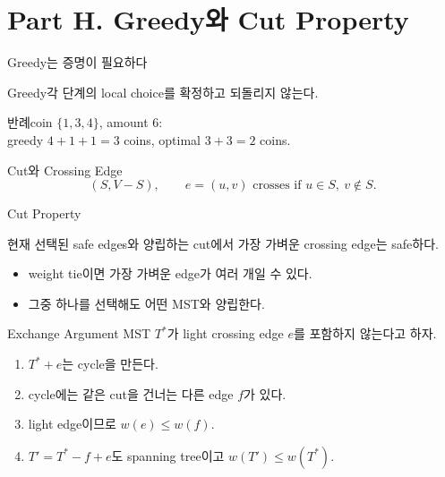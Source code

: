 \section{Part H. Greedy와 Cut Property}
\begin{frame}{Greedy는 증명이 필요하다}
\begin{block}{Greedy}각 단계의 local choice를 확정하고 되돌리지 않는다.\end{block}
\begin{alertblock}{반례}coin \(\{1,3,4\}\), amount 6:\\greedy \(4+1+1=3\) coins, optimal \(3+3=2\) coins.\end{alertblock}
\end{frame}
\begin{frame}{Cut와 Crossing Edge}
\[
(S,V-S),\qquad e=(u,v)\text{ crosses if }u\in S,\ v\notin S.
\]
\centering{}
\end{frame}
\begin{frame}{Cut Property}
\begin{theorem}현재 선택된 safe edges와 양립하는 cut에서 가장 가벼운 crossing edge는 safe하다.\end{theorem}
\begin{itemize}\item weight tie이면 가장 가벼운 edge가 여러 개일 수 있다.\item 그중 하나를 선택해도 어떤 MST와 양립한다.\end{itemize}
\end{frame}
\begin{frame}{Exchange Argument}
\small MST \(T^*\)가 light crossing edge \(e\)를 포함하지 않는다고 하자.
\begin{enumerate}\item \(T^*+e\)는 cycle을 만든다.\item cycle에는 같은 cut을 건너는 다른 edge \(f\)가 있다.\item light edge이므로 \(w(e)\le w(f)\).\item \(T'=T^*-f+e\)도 spanning tree이고 \(w(T')\le w(T^*)\).\end{enumerate}
\end{frame}
